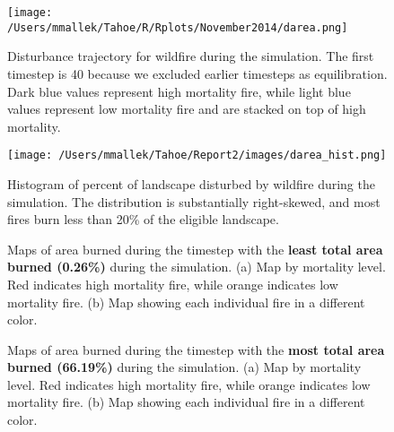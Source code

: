 \begin{figure}[!htbp]
\centering
\texttt{[image: /Users/mmallek/Tahoe/R/Rplots/November2014/darea.png]}
\caption{Disturbance trajectory for wildfire during the simulation. The first timestep is 40 because we excluded earlier timesteps as equilibration. Dark blue values represent high mortality fire, while light blue values represent low mortality fire and are stacked on top of high mortality.}
\label{fig:darea}
\end{figure}

\begin{figure}[!htbp]
\centering
\texttt{[image: /Users/mmallek/Tahoe/Report2/images/darea\_hist.png]}
\caption{Histogram of percent of landscape disturbed by wildfire during the simulation. The distribution is substantially right-skewed, and most fires burn less than 20\% of the eligible landscape.}
\label{fig:darea_hist}
\end{figure}

\begin{figure}[!htbp]
  \centering
  \caption{Maps of area burned during the timestep with the \textbf{least total area burned (0.26\%)} during the simulation. (a) Map by mortality level. Red indicates high mortality fire, while orange indicates low mortality fire. (b) Map showing each individual fire in a different color.}
  \label{fig:darea_min_map}
\end{figure}

\begin{figure}[!htbp]
  \centering
  \caption{Maps of area burned during the timestep with the \textbf{most total area burned (66.19\%)} during the simulation. (a) Map by mortality level. Red indicates high mortality fire, while orange indicates low mortality fire. (b) Map showing each individual fire in a different color.}
  \label{fig:darea_max_map}
\end{figure}

